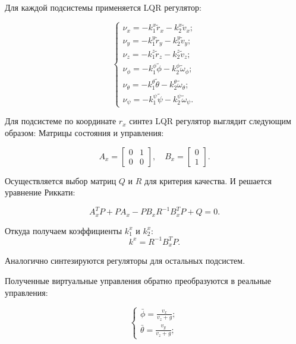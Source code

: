 Для каждой подсистемы применяется LQR регулятор:

\begin{equation}
    \begin{cases}
    \nu_x = -k_1^x \tilde{r}_x - k_2^x \tilde{v}_x; \\
    \nu_y = -k_1^y \tilde{r}_y - k_2^y \tilde{v}_y; \\
    \nu_z = -k_1^z \tilde{r}_z - k_2^z \tilde{v}_z; \\
    \nu_\phi = -k_1^\phi \tilde{\phi} - k_2^\phi \tilde{\omega}_\phi; \\
    \nu_\theta = -k_1^\theta \tilde{\theta} - k_2^\theta \tilde{\omega}_\theta; \\
    \nu_\psi = -k_1^\psi \tilde{\psi} - k_2^\psi \tilde{\omega}_\psi.
    \end{cases}
\end{equation}

Для подсистеме по координате \(r_x\) синтез LQR регулятор выглядит следующим образом:
Матрицы состояния и управления:

\begin{equation}
    A_x=\begin{bmatrix}
    0 & 1 \\
    0 & 0
\end{bmatrix}, \quad
B_x = \begin{bmatrix}
    0 \\
    1
\end{bmatrix}.\end{equation}

Осуществляется выбор матриц \(Q\) и \(R\) для критерия качества. 
И решается уравнение Риккати:

\begin{equation}
    A_x^T P + P A_x - P B_x R^{-1} B_x^T P + Q = 0.
\end{equation}

Откуда получаем коэффициенты \(k_1^x\) и \(k_2^x\):
\begin{equation}
    k^x = R^{-1} B_x^T P.
\end{equation}

Аналогично синтезируются регуляторы для остальных подсистем.

Полученные виртуальные управления обратно преобразуются в реальные управления:

\begin{equation}
    \begin{cases}
        \bar{\phi} = \frac{v_x}{v_z+g};\\
        \bar{\theta} =  \frac{v_y}{v_z+g};
    \end{cases}
\end{equation}

